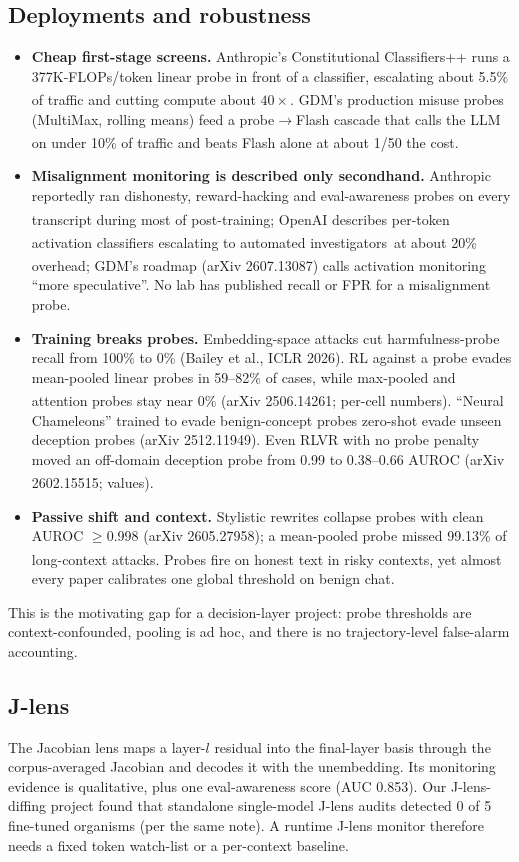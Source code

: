 \documentclass[11pt]{article}
\newcommand{\uv}{\textsuperscript{\dag}}
\begin{document}
\subsection{Deployments and robustness}
\begin{itemize}
\item \textbf{Cheap first-stage screens.} Anthropic's Constitutional Classifiers++ runs a 377K-FLOPs/token linear probe in front of a classifier, escalating about 5.5\% of traffic and cutting compute about $40\times$\uv. GDM's production misuse probes (MultiMax, rolling means) feed a probe$\to$Flash cascade that calls the LLM on under 10\% of traffic and beats Flash alone at about 1/50 the cost\uv.
\item \textbf{Misalignment monitoring is described only secondhand.} Anthropic reportedly ran dishonesty, reward-hacking and eval-awareness probes on every transcript during most of post-training\uv; OpenAI describes per-token activation classifiers escalating to automated investigators\uv\ at about 20\% overhead\uv; GDM's roadmap (arXiv 2607.13087) calls activation monitoring ``more speculative''. No lab has published recall or FPR for a misalignment probe.
\item \textbf{Training breaks probes.} Embedding-space attacks cut harmfulness-probe recall from 100\% to 0\% (Bailey et al., ICLR 2026). RL against a probe evades mean-pooled linear probes in 59--82\% of cases, while max-pooled and attention probes stay near 0\% (arXiv 2506.14261; per-cell numbers\uv). ``Neural Chameleons'' trained to evade benign-concept probes zero-shot evade unseen deception probes (arXiv 2512.11949). Even RLVR with no probe penalty moved an off-domain deception probe from 0.99 to 0.38--0.66 AUROC (arXiv 2602.15515; values\uv).
\item \textbf{Passive shift and context.} Stylistic rewrites collapse probes with clean AUROC $\ge$0.998 (arXiv 2605.27958); a mean-pooled probe missed 99.13\% of long-context attacks\uv. Probes fire on honest text in risky contexts, yet almost every paper calibrates one global threshold on benign chat.
\end{itemize}
This is the motivating gap for a decision-layer project: probe thresholds are context-confounded, pooling is ad hoc, and there is no trajectory-level false-alarm accounting.

\subsection{J-lens}
The Jacobian lens maps a layer-$l$ residual into the final-layer basis through the corpus-averaged Jacobian and decodes it with the unembedding. Its monitoring evidence is qualitative, plus one eval-awareness score (AUC 0.853). Our J-lens-diffing project found that standalone single-model J-lens audits detected 0 of 5 fine-tuned organisms (per the same note). A runtime J-lens monitor therefore needs a fixed token watch-list or a per-context baseline.
\end{document}
